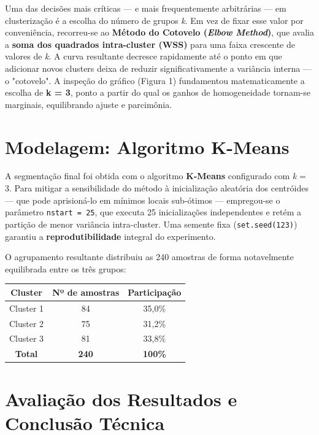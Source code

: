 \documentclass[11pt,a4paper]{article}
\begin{document}
Uma das decisões mais críticas --- e mais frequentemente arbitrárias --- em clusterização é a escolha do número de grupos \textit{k}. Em vez de fixar esse valor por conveniência, recorreu-se ao \textbf{Método do Cotovelo (\textit{Elbow Method})}, que avalia a \textbf{soma dos quadrados intra-cluster (WSS)} para uma faixa crescente de valores de \textit{k}. A curva resultante decresce rapidamente até o ponto em que adicionar novos clusters deixa de reduzir significativamente a variância interna --- o "cotovelo". A inspeção do gráfico (Figura 1) fundamentou matematicamente a escolha de \textbf{k = 3}, ponto a partir do qual os ganhos de homogeneidade tornam-se marginais, equilibrando ajuste e parcimônia.

\section{Modelagem: Algoritmo K-Means}

A segmentação final foi obtida com o algoritmo \textbf{K-Means} configurado com \textit{k} = 3. Para mitigar a sensibilidade do método à inicialização aleatória dos centróides --- que pode aprisioná-lo em mínimos locais sub-ótimos --- empregou-se o parâmetro \texttt{nstart = 25}, que executa 25 inicializações independentes e retém a partição de menor variância intra-cluster. Uma semente fixa (\texttt{set.seed(123)}) garantiu a \textbf{reprodutibilidade} integral do experimento.

O agrupamento resultante distribuiu as 240 amostras de forma notavelmente equilibrada entre os três grupos:

\begin{table}[H]
\centering
\renewcommand{\arraystretch}{1.3}
\begin{tabular}{ccc}
\toprule
\textbf{Cluster} & \textbf{Nº de amostras} & \textbf{Participação} \\
\midrule
Cluster 1 & 84 & 35,0\% \\
Cluster 2 & 75 & 31,2\% \\
Cluster 3 & 81 & 33,8\% \\
\midrule
\textbf{Total} & \textbf{240} & \textbf{100\%} \\
\bottomrule
\end{tabular}
\end{table}

\section{Avaliação dos Resultados e Conclusão Técnica}
\end{document}
